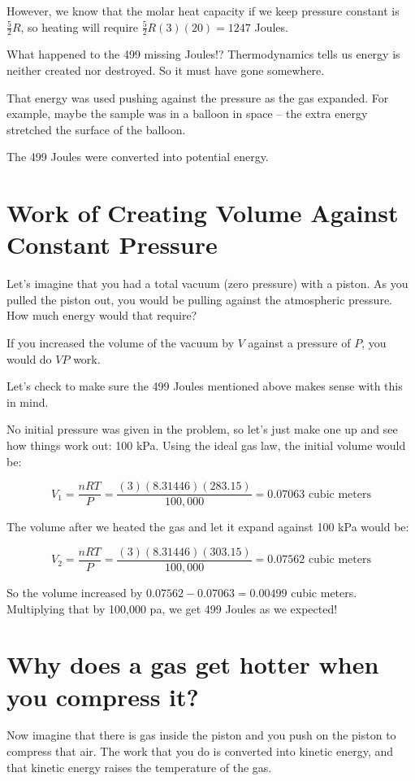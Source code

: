 However,  we know that the molar heat capacity if we keep pressure constant is $\frac{5}{2}R$,  so  heating will require $\frac{5}{2}R(3)(20) = 1247$ Joules.  

What happened to the 499 missing Joules!?  Thermodynamics tells us energy is neither created nor destroyed.  So it must have gone somewhere.

That energy was used pushing against the pressure as the gas expanded.  For example,  maybe the sample was in a balloon in space -- the extra energy stretched the surface of the balloon.  

The 499 Joules were converted into potential energy.   

\section{Work of Creating Volume Against Constant Pressure}

Let's imagine that you had a total vacuum (zero pressure) with a piston.  As you pulled the piston out,  you would be pulling against  the atmospheric pressure.  How much energy would that require?

If you increased the volume of the vacuum by $V$ against a pressure of $P$,   you would do $VP$ work.

Let's check to make sure the 499 Joules mentioned above makes sense with this in mind.

No initial pressure was given in the problem, so let's just make one up and see how things work out: 100 kPa.  Using the ideal gas law,  the initial volume would be:

$$V_1 = \frac{n R T}{P} = \frac{(3)(8.31446)(283.15)}{100,000} = 0.07063\text{ cubic meters}$$

The volume after we heated the gas and let it expand against 100 kPa would be:

$$V_2 = \frac{n R T}{P} = \frac{(3)(8.31446)(303.15)}{100,000} = 0.07562\text{ cubic meters}$$

So the volume increased by $0.07562 - 0.07063 = 0.00499$ cubic meters.   
Multiplying that by 100,000 pa, we get 499 Joules as we expected!

\section{Why does a gas get hotter when you compress it?}

Now imagine that there is gas inside the piston and you push on the piston to compress that air.   The work that you do is converted into kinetic energy,  and that kinetic energy raises the temperature of the gas.

